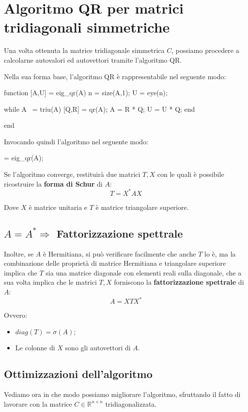 \section{Algoritmo QR per matrici tridiagonali simmetriche}
Una volta ottenuta la matrice tridiagonale simmetrica $C$, possiamo procedere a 
calcolarne autovalori ed autovettori tramite l'algoritmo QR.

Nella sua forma base, l'algoritmo QR è rappresentabile nel seguente modo:

\begin{programma}
function [A,U] = eig_qr(A)
n = size(A,1);
U = eye(n);

while A ~= triu(A)
	[Q,R] = qr(A);
	A = R * Q;
	U = U * Q;
end

end
\end{programma}

Invocando quindi l'algoritmo nel seguente modo:
\begin{programma}
	[T,X] = eig_qr(A);
\end{programma}
Se l'algoritmo converge, restituirà due matrici $T,X$ con le quali è possibile 
ricostruire la \textbf{forma di Schur} di $A$:
\begin{equation*}
	T = X^* A X
\end{equation*}

Dove $X$ è matrice unitaria e $T$ è matrice triangolare superiore. 
\subsection{$A = A^* \Rightarrow $ Fattorizzazione spettrale}
Inoltre, se $A$ è Hermitiana, si può verificare facilmente che anche $T$ lo è, 
ma la combinazione delle proprietà di matrice Hermitiana e triangolare superiore 
implica che $T$ sia una matrice diagonale con elementi reali sulla diagonale, 
che a sua volta implica che le matrici $T,X$ forniscono la 
\textbf{fattorizzazione spettrale} di $A$:
\begin{equation*}
	A = X T X^*
\end{equation*}

Ovvero:
\begin{itemize}
	\item $diag(T) = \sigma(A)$;
	\item Le colonne di $X$ sono gli autovettori di $A$.
\end{itemize}

\newpage
\subsection{Ottimizzazioni dell'algoritmo}
Vediamo ora in che modo possiamo migliorare l'algoritmo, sfruttando il fatto di 
lavorare con la matrice $C\in \mathbb{R}^{n \times n}$ tridiagonalizzata.


